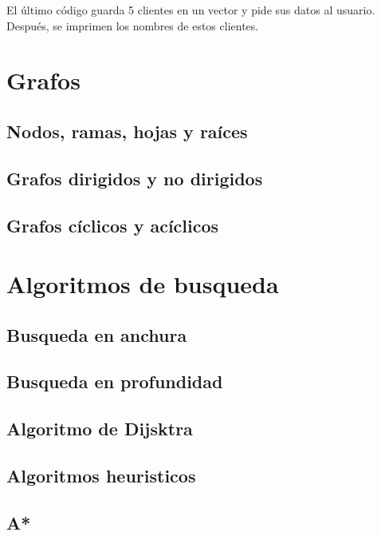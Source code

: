 \documentclass{article}
\begin{document}
El último código guarda 5 clientes en un vector y pide sus datos al usuario. Después, se imprimen los nombres de estos clientes.

\section{Grafos}

\subsection{Nodos, ramas, hojas y raíces}

\subsection{Grafos dirigidos y no dirigidos}

\subsection{Grafos cíclicos y acíclicos}

\section{Algoritmos de busqueda}

\subsection{Busqueda en anchura}

\subsection{Busqueda en profundidad}

\subsection{Algoritmo de Dijsktra}

\subsection{Algoritmos heuristicos}

\subsection{A*}
\end{document}
